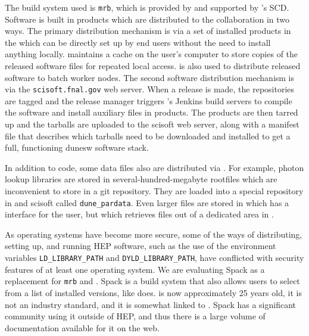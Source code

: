 \documentclass[../main-v1.tex]{subfiles}
\begin{document}
The build system used is {\tt mrb}, which is provided by and supported by 's SCD.  Software is built in  products which are distributed to the collaboration in two ways.  The primary distribution mechanism is via a set of installed products in the  which can be directly set up by end users without the need to install anything locally.   maintains a cache on the user's computer to store copies of the released software files for repeated local access.   is also used to distribute released software to batch worker nodes.  The second software distribution mechanism is via the {\tt scisoft.fnal.gov} web server.  When a release is made, the repositories are tagged and the release manager triggers 's Jenkins build servers to compile the software and install auxiliary files in  products.  The  products are then tarred up and the tarballs are uploaded to the scisoft web server, along with a manifest file that describes which tarballs need to be downloaded and installed to get a full, %
functioning dunesw software stack.

In addition to code, some data files also are distributed via .  For example, photon lookup libraries are stored in several-hundred-megabyte rootfiles which are inconvenient to store in a git repository.  They are loaded into a special repository in  and scisoft called {\tt dune\_pardata}.  Even larger files are stored in  which has a  interface for the user, but which retrieves files out of a dedicated area in .

As operating systems have become more secure, some of the ways of distributing, setting up, and running HEP software, such as the use of the environment variables {\tt LD\_LIBRARY\_PATH} and {\tt DYLD\_LIBRARY\_PATH}, have conflicted with security features of at least one operating system.  We are evaluating Spack as a replacement for {\tt mrb} and .  Spack is a build system that also allows users to select from a list of installed versions, like  does.  is now approximately 25 years old, it is not an industry standard, and it is somewhat linked to .  Spack has a significant community using it outside of HEP, and thus there is a large volume of documentation available for it on the web.
\end{document}
